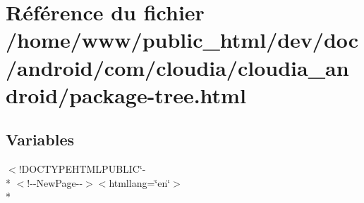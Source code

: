 \hypertarget{com_2cloudia_2cloudia__android_2package-tree_8html}{\section{Référence du fichier /home/www/public\-\_\-html/dev/doc/android/com/cloudia/cloudia\-\_\-android/package-\/tree.html}
\label{com_2cloudia_2cloudia__android_2package-tree_8html}
}
\subsection*{Variables}
\begin{DoxyCompactItemize}
\item 
$<$!D\-O\-C\-T\-Y\-P\-E\-H\-T\-M\-L\-P\-U\-B\-L\-I\-C\char`\"{}-\/\\*
$<$!-\/-\/New\-Page-\/-\/$>$$<$htmllang=\char`\"{}en\char`\"{}$>$\\*
$$
\end{DoxyCompactItemize}
